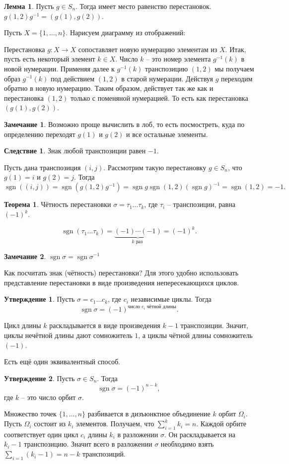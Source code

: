 \documentclass[10pt,a4paper,oneside]{book}
\theoremstyle{definition}
\newtheorem*{rem}{\color{green!50!blue}Замечание}
\newtheorem{thm}{\color{red!40!black}Теорема}
\newtheorem{lem}{\color{green!50!black}Лемма}
\newtheorem{cor}{\color{green!45!black}Следствие}
\newtheorem{utvr}{\color{blue!50!black}Утверждение}
\newcommand{\sgn}{\operatorname{sgn}}
\def\thrm{\begin{thm}}
\def\ethrm{\end{thm}}
\def\lm{\begin{lem}}
\def\elm{\end{lem}}
\def\crl{\begin{cor}}
\def\ecrl{\end{cor}}
\def\rm{\begin{rem}}
\def\erm{\end{rem}}
\def\utv{\begin{utvr}}
\def\eutv{\end{utvr}}
\begin{document}
\lm Пусть $g\in S_n$. Тогда имеет место равенство перестановок. $g(1,2)g^{-1}=(g(1),g(2))$.
\elm
\proof Пусть $X=\{1,\dots,n\}$. Нарисуем диаграмму из отображений:
\begin{center}
\end{center}
Перестановка $g\colon X \to X$ сопоставляет новую нумерацию элементам из $X$. Итак, пусть есть некоторый элемент $k\in X$. Число $k$ -- это номер элемента $g^{-1}(k)$ в новой нумерации. Применяя далее к $g^{-1}(k)$ транспозицию $(1,2)$ мы получаем образ $g^{-1}(k)$ под действием $(1,2)$ в старой нумерации. Действуя $g$ переходим обратно в новую нумерацию. 
Таким образом, действует так же как и перестановка $(1,2)$ только с поменяной нумерацией. То есть как перестановка $(g(1),g(2))$.
\endproof

\rm Возможно проще вычислить в лоб, то есть посмостреть, куда по определению переходят $g(1)$ и $g(2)$ и все остальные элементы.
\erm

\crl Знак любой транспозиции равен $-1$.
\ecrl
\proof Пусть дана транспозиция $(i,j)$. Рассмотрим такую перестановку $g\in S_n$, что $g(1)=i$ и $g(2)=j$. Тогда $$\sgn((i,j))=\sgn(g(1,2)g^{-1})=\sgn g \sgn (1,2) (\sgn g)^{-1}=\sgn (1,2)=-1.$$ 
\endproof


\thrm Чётность перестановки $\sigma=\tau_1\dots \tau_k$, где $\tau_i$ -- транспозиции, равна $(-1)^{k}$.
\ethrm
\proof
$$\sgn(\tau_1\dots \tau_k)=\underbrace{(-1)\cdots (-1)}_{k \text{ раз }}=(-1)^k.$$

\endproof

\rm $\sgn \sigma = \sgn \sigma^{-1}$
\erm

Как посчитать знак (чётность) перестановки? Для этого удобно использовать представление перестановки в виде произведения непересекающихся циклов.

\utv Пусть $\sigma=c_1\dots c_k$, где $c_i$ независимые циклы. Тогда
$$\sgn \sigma = (-1)^{\text{число $c_i$ чётной длины}}.$$
\eutv
\proof Цикл длины $k$ раскладывается в виде произведения $k-1$ транспозиции. Значит, циклы нечётной длины дают сомножитель $1$, а циклы чётной длины сомножитель $(-1)$.
\endproof

Есть ещё один эквивалентный способ.
\utv Пусть $\sigma\in S_n$. Тогда
$$\sgn \sigma = (-1)^{n-k},$$
где $k$ -- это число орбит $\sigma$.
\eutv
\proof Множество точек $\{1,\dots,n\}$ разбивается в дизъюнктное объединение  $k$ орбит $\Omega_i$. Пусть $\Omega_i$ состоит из $k_i$ элементов. Получаем, что $\sum_{i=1}^{k} k_i=n$. Каждой орбите соответствует один цикл $c_i$ длины $k_i$ в разложении $\sigma$. Он раскладывается на $k_i-1$ транспозицию. Значит всего в разложении $\sigma$ необходимо взять $\sum_{i=1}(k_i-1)=n-k$ транспозиций. 
\endproof
\end{document}

